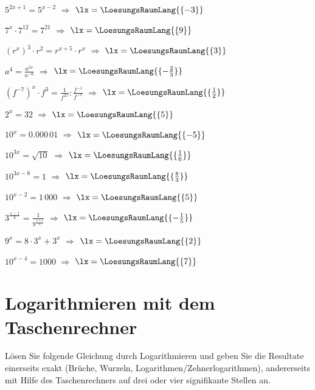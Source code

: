 \begin{bbwAufgabenBlock}
\item $5^{2x+1} = 5^{x-2}$                        $\Longrightarrow$ $\lx=\LoesungsRaumLang{\{-3\}}$ 
\item $7^x \cdot 7^{12} = 7^{21}$                 $\Longrightarrow$ $\lx=\LoesungsRaumLang{\{9\}}$ \noTRAINER{\seitenUmbruchImAufgabenteil{}}
\item $(r^x)^3 \cdot{} r^2 = r^{x+5} \cdot{} r^x$ $\Longrightarrow$ $\lx=\LoesungsRaumLang{\{3\}}$ 
\item $a^4 = \frac{a^{3x}}{a^{-6}}$ $\Longrightarrow$ $\lx=\LoesungsRaumLang{\{-\frac23\}}$ \noTRAINER{\seitenUmbruchImAufgabenteil{}}
\item $(f^{-7})^x \cdot{} f^3 = \frac{1}{f^{2x}} : \frac{f^{-1}}{f^{-x}}$ $\Longrightarrow$ $\lx=\LoesungsRaumLang{\{\frac12\}}$ 
\item $2^x=32$ $\Longrightarrow$ $\lx=\LoesungsRaumLang{\{5\}}$ \noTRAINER{\seitenUmbruchImAufgabenteil{}}
\item $10^x=0.000\,01$ $\Longrightarrow$ $\lx=\LoesungsRaumLang{\{-5\}}$ 
\item $10^{3x}=\sqrt{10}$ $\Longrightarrow$ $\lx=\LoesungsRaumLang{\{\frac16\}}$ \noTRAINER{\seitenUmbruchImAufgabenteil{}}
\item $10^{3x-8}=1$ $\Longrightarrow$ $\lx=\LoesungsRaumLang{\{\frac83\}}$ 
\item $10^{x-2}=1\,000$ $\Longrightarrow$ $\lx=\LoesungsRaumLang{\{5\}}$ \noTRAINER{\seitenUmbruchImAufgabenteil{}}

\item $3^{\frac{x-1}{3}} = \frac1{9^{\frac{x+1}{4}}}$ $\Longrightarrow$ $\lx=\LoesungsRaumLang{\{-\frac15\}}$ 
\item $9^x = 8\cdot{}3^x + 3^x$ $\Longrightarrow$ $\lx=\LoesungsRaumLang{\{2\}}$ 

\item $10^{x-4}=1000$ $\Longrightarrow$ $\lx=\LoesungsRaumLang{\{7\}}$ 

\end{bbwAufgabenBlock}
\newpage
%
%
\section{Logarithmieren mit dem Taschenrechner}
Lösen Sie folgende Gleichung durch Logarithmieren und geben Sie die
Resultate einerseits exakt (Brüche, Wurzeln, Logarithmen/Zehnerlogarithmen), andererseits mit
Hilfe des Taschenrechners auf drei oder vier signifikante Stellen an.

